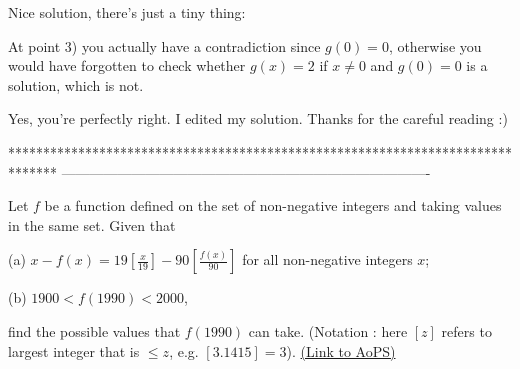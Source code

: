 \begin{solution}
	\begin{tcolorbox}Nice solution, there's just a tiny thing:

At point 3) you actually have a contradiction since $ g(0) = 0$, otherwise you would have forgotten to check whether $ g(x) = 2$ if  $ x \neq 0$ and $ g(0) = 0$ is a solution, which is not.\end{tcolorbox}

Yes, you're perfectly right. I edited my solution.
Thanks for the careful reading :)
\end{solution}
*******************************************************************************
-------------------------------------------------------------------------------

\begin{problem}
	Let $ f$ be a function defined on the set of non-negative integers and taking values in the same
set. Given that

(a) $ \displaystyle x - f(x) = 19\left[\frac{x}{19}\right] - 90\left[\frac{f(x)}{90}\right]$ for all non-negative integers $ x$;

(b) $ 1900 < f(1990) < 2000$,

find the possible values that $ f(1990)$ can take.
(Notation : here $ [z]$ refers to largest integer that is $ \leq z$, e.g. $ [3.1415] = 3$).
	\flushright \href{https://artofproblemsolving.com/community/c6h295763}{(Link to AoPS)}
\end{problem}



